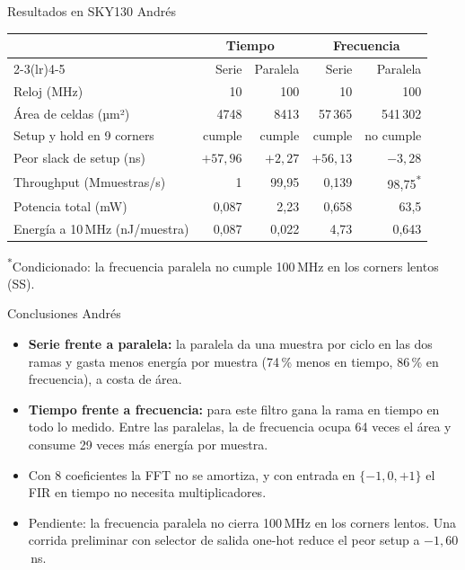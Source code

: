 \documentclass[aspectratio=169,11pt]{beamer}
\newcommand{\presenta}[1]{\hfill{\normalfont\small\color{gray}#1}}
\begin{document}
\begin{frame}{Resultados en SKY130 \presenta{Andrés}}
  \centering
  \small
  \begin{tabular}{lrrrr}
    \toprule
    & \multicolumn{2}{c}{Tiempo} & \multicolumn{2}{c}{Frecuencia} \\
    \cmidrule(lr){2-3}\cmidrule(lr){4-5}
    & Serie & Paralela & Serie & Paralela \\
    \midrule
    Reloj (MHz) & 10 & 100 & 10 & 100 \\
    Área de celdas (µm²) & 4748 & 8413 & 57\,365 & 541\,302 \\
    Setup y hold en 9 corners & cumple & cumple & cumple & \textcolor{serie2}{no cumple} \\
    Peor slack de setup (ns) & $+57{,}96$ & $+2{,}27$ & $+56{,}13$ & $-3{,}28$ \\
    Throughput (Mmuestras/s) & 1 & 99,95 & 0,139 & 98,75\textsuperscript{*} \\
    Potencia total (mW) & 0,087 & 2,23 & 0,658 & 63,5 \\
    Energía a 10\,MHz (nJ/muestra) & 0,087 & 0,022 & 4,73 & 0,643 \\
    \bottomrule
  \end{tabular}

  \medskip
  \footnotesize\textsuperscript{*}Condicionado: la frecuencia paralela no cumple 100\,MHz en los corners lentos (SS).
\end{frame}

\begin{frame}{Conclusiones \presenta{Andrés}}
  \begin{itemize}
    \item \textbf{Serie frente a paralela:} la paralela da una muestra por ciclo en las dos ramas y gasta menos energía por muestra (74\,\% menos en tiempo, 86\,\% en frecuencia), a costa de área.
    \item \textbf{Tiempo frente a frecuencia:} para este filtro gana la rama en tiempo en todo lo medido. Entre las paralelas, la de frecuencia ocupa 64 veces el área y consume 29 veces más energía por muestra.
    \item Con 8 coeficientes la FFT no se amortiza, y con entrada en $\{-1, 0, +1\}$ el FIR en tiempo no necesita multiplicadores.
    \item Pendiente: la frecuencia paralela no cierra 100\,MHz en los corners lentos. Una corrida preliminar con selector de salida one-hot reduce el peor setup a $-1{,}60$\,ns.
  \end{itemize}
\end{frame}
\end{document}

